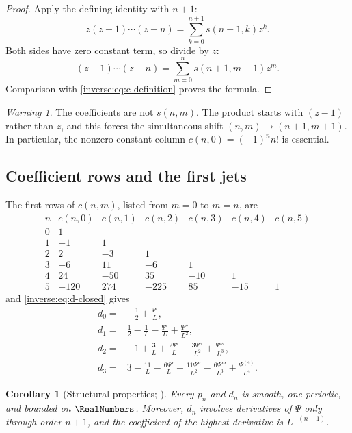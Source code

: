 \documentclass[11pt,oneside]{article}
\newtheorem{corollary}[corollary]{Corollary}
\theoremstyle{definition}
\theoremstyle{remark}
\newtheorem{warning}[warning]{Warning}
\begin{document}
\begin{proof}
Apply the defining identity with $n+1$:
\[
 z(z-1)\cdots(z-n)
 =\sum_{k=0}^{n+1}s(n+1,k)z^k.
\]
Both sides have zero constant term, so divide by $z$:
\[
 (z-1)\cdots(z-n)
 =\sum_{m=0}^n s(n+1,m+1)z^m.
\]
Comparison with \eqref{inverse:eq:c-definition} proves the formula.
\end{proof}

\begin{warning}
The coefficients are not $s(n,m)$.  The product starts with $(z-1)$
rather than $z$, and this forces the simultaneous shift
$(n,m)\mapsto(n+1,m+1)$.  In particular, the nonzero constant column
$c(n,0)=(-1)^nn!$ is essential.
\end{warning}

\subsection{Coefficient rows and the first jets}

The first rows of $c(n,m)$, listed from $m=0$ to $m=n$, are
\[
\begin{array}{c|rrrrrr}
n&c(n,0)&c(n,1)&c(n,2)&c(n,3)&c(n,4)&c(n,5)\\
\hline
0&1\\
1&-1&1\\
2&2&-3&1\\
3&-6&11&-6&1\\
4&24&-50&35&-10&1\\
5&-120&274&-225&85&-15&1
\end{array}
\]
and \eqref{inverse:eq:d-closed} gives
\begin{align}
 d_0={}&-\frac12+\frac{\Psi'}L, \label{inverse:eq:d0-explicit}\\
 d_1={}&\frac12-\frac1L-\frac{\Psi'}L+\frac{\Psi''}{L^2},
 \label{inverse:eq:d1-explicit}\\
 d_2={}&-1+\frac3L+\frac{2\Psi'}L
       -\frac{3\Psi''}{L^2}+\frac{\Psi'''}{L^3},
 \label{inverse:eq:d2-explicit}\\
 d_3={}&3-\frac{11}{L}-\frac{6\Psi'}L
       +\frac{11\Psi''}{L^2}-\frac{6\Psi'''}{L^3}
       +\frac{\Psi^{(4)}}{L^4}. \label{inverse:eq:d3-explicit}
\end{align}

\begin{corollary}[Structural properties; \Formalized]
\label{inverse:cor:jet-structure}
Every $p_n$ and $d_n$ is smooth, one-periodic, and bounded on $\RealNumbers$.
Moreover, $d_n$ involves derivatives of $\Psi$ only through order $n+1$,
and the coefficient of the highest derivative is $L^{-(n+1)}$.
\end{corollary}
\end{document}
